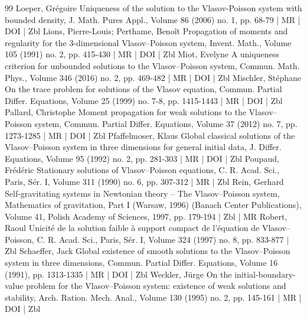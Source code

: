 \documentclass[10pt]{amsart}
\theoremstyle{definition}\newtheorem{defi}[theo]{Definition}\newtheorem{rema}[theo]{Remark}\newtheorem{exam}[theo]{Example}\newtheorem{exem}[theo]{Example}\newtheorem{nota}[theo]{Notation}
\begin{document}
\begin{thebibliography}{99}
Loeper, Grégoire Uniqueness of the solution to the Vlasov-Poisson system with bounded density, J. Math. Pures Appl., Volume 86 (2006) no. 1, pp. 68-79 | MR | DOI | Zbl
Lions, Pierre-Louis; Perthame, Benoît Propagation of moments and regularity for the 3-dimensional Vlasov–Poisson system, Invent. Math., Volume 105 (1991) no. 2, pp. 415-430 | MR | DOI | Zbl
Miot, Evelyne A uniqueness criterion for unbounded solutions to the Vlasov–Poisson system, Commun. Math. Phys., Volume 346 (2016) no. 2, pp. 469-482 | MR | DOI | Zbl
Mischler, Stéphane On the trace problem for solutions of the Vlasov equation, Commun. Partial Differ. Equations, Volume 25 (1999) no. 7-8, pp. 1415-1443 | MR | DOI | Zbl
Pallard, Christophe Moment propagation for weak solutions to the Vlasov–Poisson system, Commun. Partial Differ. Equations, Volume 37 (2012) no. 7, pp. 1273-1285 | MR | DOI | Zbl
Pfaffelmoser, Klaus Global classical solutions of the Vlasov–Poisson system in three dimensions for general initial data, J. Differ. Equations, Volume 95 (1992) no. 2, pp. 281-303 | MR | DOI | Zbl
Poupaud, Frédéric Stationary solutions of Vlasov–Poisson equations, C. R. Acad. Sci., Paris, Sér. I, Volume 311 (1990) no. 6, pp. 307-312 | MR | Zbl
Rein, Gerhard Self-gravitating systems in Newtonian theory – The Vlasov–Poisson system, Mathematics of gravitation, Part I (Warsaw, 1996) (Banach Center Publications), Volume 41, Polish Academy of Sciences, 1997, pp. 179-194 | Zbl | MR
Robert, Raoul Unicité de la solution faible à support compact de l’équation de Vlasov–Poisson, C. R. Acad. Sci., Paris, Sér. I, Volume 324 (1997) no. 8, pp. 833-877 | Zbl
Schaeffer, Jack Global existence of smooth solutions to the Vlasov–Poisson system in three dimensions, Commun. Partial Differ. Equations, Volume 16 (1991), pp. 1313-1335 | MR | DOI | Zbl
Weckler, Jürge On the initial-boundary-value problem for the Vlasov–Poisson system: existence of weak solutions and stability, Arch. Ration. Mech. Anal., Volume 130 (1995) no. 2, pp. 145-161 | MR | DOI | Zbl
\end{thebibliography}
\end{document}
